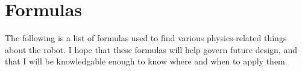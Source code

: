 \section{Formulas}

The following is a list of formulas used to find various physics-related things about the robot. I hope that these formulas will help govern future design, and that I will be knowledgable enough to know where and when to apply them.
